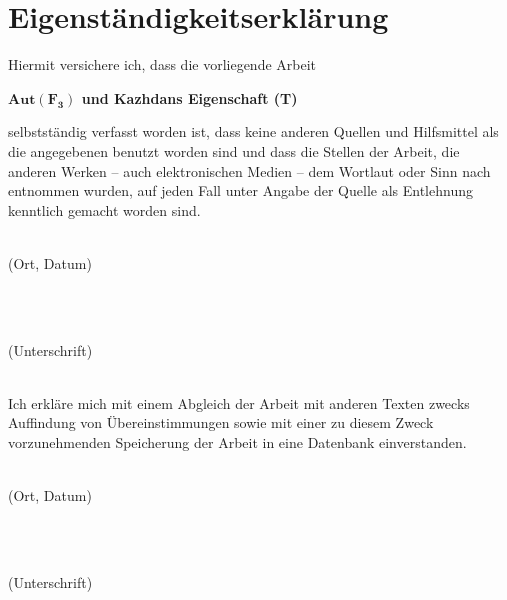\cleardoubleoddemptypage

\chapter*{Eigenständigkeitserklärung}
Hiermit versichere ich, dass die vorliegende Arbeit

\begin{center}
	\Large \sffamily\bfseries $\mathbf{Aut}\boldsymbol{(F_3)}$ und Kazhdans Eigenschaft (T)
\end{center}

selbstständig verfasst worden ist, dass keine anderen Quellen und Hilfsmittel als die angegebenen benutzt worden sind und dass die Stellen der Arbeit, die anderen Werken -- auch elektronischen Medien -- dem Wortlaut oder Sinn nach entnommen wurden, auf jeden Fall unter Angabe der Quelle als Entlehnung kenntlich gemacht worden sind.

\vspace*{2cm}

\begin{minipage}{0.5\textwidth}
	\begin{flushleft} \large
		\underline{\hspace{6cm}} \\
		{\footnotesize (Ort, Datum)}
	\end{flushleft}
\end{minipage}
~
\begin{minipage}{0.5\textwidth}
	\begin{flushright} \large
		\underline{\hspace{6cm}} \\
		{\footnotesize (Unterschrift)}
	\end{flushright}
\end{minipage}\\[2cm]

Ich erkläre mich mit einem Abgleich der Arbeit mit anderen Texten zwecks Auffindung von Übereinstimmungen sowie mit einer zu diesem Zweck vorzunehmenden Speicherung der Arbeit in eine Datenbank einverstanden.

\vspace*{2cm}

\begin{minipage}{0.5\textwidth}
	\begin{flushleft} \large
		\underline{\hspace{6cm}} \\
		{\footnotesize (Ort, Datum)}
	\end{flushleft}
\end{minipage}
~
\begin{minipage}{0.5\textwidth}
	\begin{flushright} \large
		\underline{\hspace{6cm}} \\
		{\footnotesize (Unterschrift)}
	\end{flushright}
\end{minipage}\\[2cm]